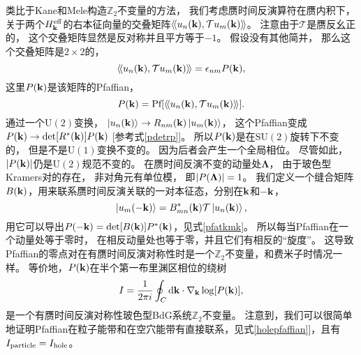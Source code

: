 类比于Kane和Mele构造$\mathbb Z_2$不变量的方法\cite{Kane2005}，
我们考虑赝时间反演算符在赝内积下，
关于两个$H^{\text{eff}}_{\vb k}$的右本征向量的交叠矩阵$\langle\!\langle u_n(\vb k),\mathcal T u_m(\vb k) \rangle\!\rangle$。
注意由于$\mathcal T$是赝反幺正的，
这个交叠矩阵显然是反对称并且平方等于$-1$。
假设没有其他简并，
那么这个交叠矩阵是$2\times 2$的，
\begin{equation}\label{overlap}
	\langle\!\langle u_n(\vb k),\mathcal T u_m(\vb k) \rangle\!\rangle=\epsilon_{nm} P(\vb k),
\end{equation}
这里$P(\vb k)$是该矩阵的Pfaffian，
\begin{equation}
	P(\vb k)=\textnormal{Pf}[\langle\!\langle u_n(\vb k),\mathcal T u_m(\vb k) \rangle\!\rangle].\label{defpf}
\end{equation}
通过一个$\mathrm{U}(2)$变换，
$\ket{u_n(\vb k)} \rightarrow  R_{nm}(\vb k)\ket{u_m(\vb k)}$，
这个Pfaffian变成$P(\vb k) \rightarrow  \det[R^*(\vb k)]P(\vb k)$ [参考式\eqref{pdetrp}]。
所以$P(\vb k)$是在$\mathrm{SU}(2)$旋转下不变的，
但是不是$\mathrm{U}(1)$变换不变的。
因为后者会产生一个全局相位。
尽管如此，
$\abs{P(\vb k)}$仍是$\mathrm{U}(2)$规范不变的。
在赝时间反演不变的动量处$\boldsymbol{\Lambda} $，
由于玻色型Kramers对的存在，
非对角元有单位模，
即$\abs{P(\boldsymbol{\Lambda} )}=1$。
我们定义一个缝合矩阵$B(\vb k)$，用来联系赝时间反演关联的一对本征态，分别在$\vb k$和$-\vb k$，
\begin{equation}
	\ket{u_m(-\vb k)}=B^*_{mn}(\vb k)\mathcal T \ket{u_n(\vb k)},\label{sewingm}
\end{equation}
用它可以导出$P(-\vb k)=\det[B(\vb k)] P^*(\vb k)$，见式\eqref{pfatkmk}。
所以每当Pfaffian在一个动量处等于零时，
在相反动量处也等于零，并且它们有相反的“旋度”。
这导致Pfaffian的零点对在有赝时间反演对称性时是一个$\mathbb Z_2$不变量，和费米子时情况一样\cite{Kane2005}。
等价地，$P(\vb k)$在半个第一布里渊区相位的绕树\begin{equation}
	I= \frac{1}{2\pi i}\oint_C \dd{\vb k}\cdot\nabla_{\vb k}\log[P(\vb k)],\nonumber
\end{equation}
是一个有赝时间反演对称性玻色型BdG系统$\mathbb Z_2$不变量。
注意到，我们可以很简单地证明Pfaffian在粒子能带和在空穴能带有直接联系，见式\eqref{holepfaffian}]，且有$I_\textnormal{particle}=I_\textnormal{hole}$。


